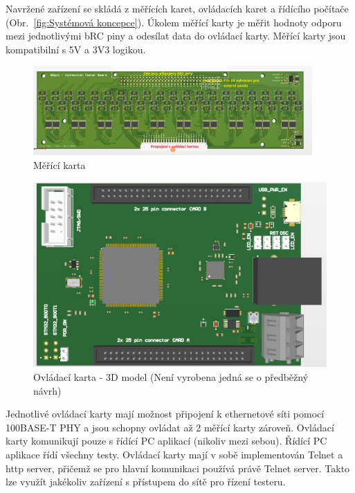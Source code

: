     Navržené zařízení se skládá z měřících karet, ovládacích karet a řídícího počítače
    \mbox{(Obr. \ref{fig:Systémová koncepce})}.
    Úkolem měřící karty je měřit hodnoty odporu mezi jednotlivými bRC piny
    a odesílat data do ovládací karty. Měřící karty jsou kompatibilní s 5V a 3V3 logikou.\\

    \begin{figure}[ht!] 
        \centering
        \includegraphics[width = 0.95\textwidth]{obrazky/karta_3D_NP.png}
        \caption{Měřící karta}
        \label{fig:Měřící karta}
    \end{figure}


    \begin{figure}[ht!]
        \centering
        \includegraphics[width = 1\textwidth]{obrazky/3D_ovl_karta.png}
        \caption{Ovládací karta - 3D model (Není vyrobena jedná se o předběžný návrh)}
        \label{fig:Ovládací karta - 3D model}
    \end{figure}

    Jednotlivé ovládací karty mají možnost připojení k ethernetové síti pomocí
    100BASE-T PHY a jsou schopny ovládat až 2 měřící karty zároveň.
    Ovládací karty komunikují pouze s řídící PC aplikací (nikoliv mezi sebou).
    Řídící PC aplikace řídí všechny testy. Ovládací karty mají v sobě implementován Telnet a http server,
    přičemž se pro hlavní komunikaci používá právě Telnet server.
    Takto lze využít jakékoliv zařízení s přístupem do sítě pro řízení testeru.\\
    
